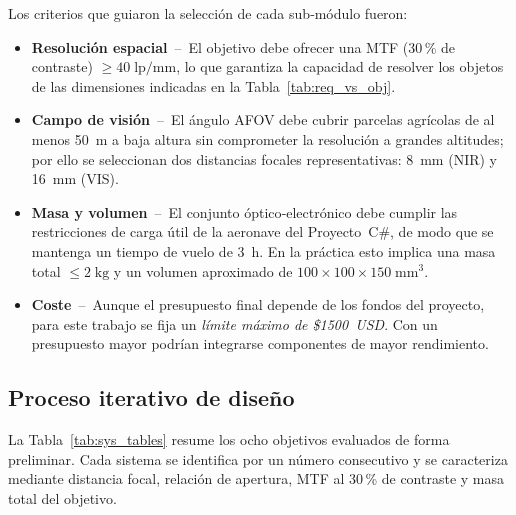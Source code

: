 Los criterios que guiaron la selección de cada sub‑módulo fueron:

\begin{itemize}
    \item \textbf{Resolución espacial} – El objetivo debe ofrecer una MTF (30\,\% de contraste) 
          \textbf{$\geq 40\;\text{lp/mm}$}, lo que garantiza la capacidad de resolver los objetos 
          de las dimensiones indicadas en la Tabla~\ref{tab:req_vs_obj}.
          
    \item \textbf{Campo de visión} – El ángulo AFOV debe cubrir parcelas agrícolas 
          de al menos 50 m a baja altura sin comprometer la resolución a grandes altitudes; 
          por ello se seleccionan dos distancias focales representativas: 
          8 mm (NIR) y 16 mm (VIS).
          
    \item \textbf{Masa y volumen} – El conjunto óptico‑electrónico debe cumplir las 
          restricciones de carga útil de la aeronave del Proyecto C\#, 
          de modo que se mantenga un tiempo de vuelo de 3 h.  
          En la práctica esto implica una masa total $\leq 2\;\text{kg}$ 
          y un volumen aproximado de $100\times100\times150\;\text{mm}^{3}$.
          
    \item \textbf{Coste} – Aunque el presupuesto final depende de los fondos del proyecto, 
          para este trabajo se fija un \emph{límite máximo de \$1500 USD}.  
          Con un presupuesto mayor podrían integrarse componentes de mayor rendimiento.
\end{itemize}


\subsection{Proceso iterativo de diseño}
\label{sec:cad}

La Tabla~\ref{tab:sys_tables} resume los ocho objetivos evaluados de
forma preliminar.  Cada sistema se identifica por un número consecutivo y se
caracteriza mediante distancia focal, relación de apertura, MTF al 30\,\% de
contraste y masa total del objetivo.

